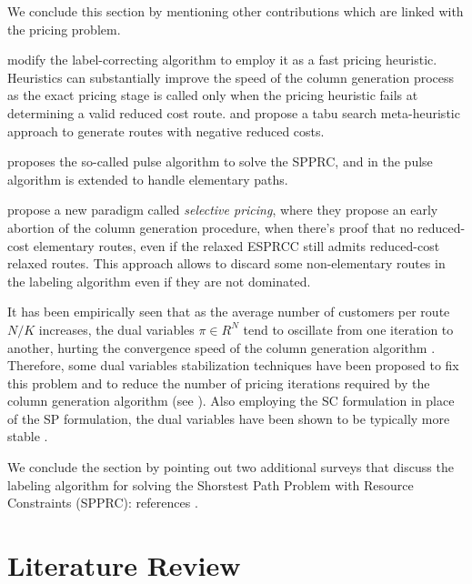 \medskip

We conclude this section by mentioning other contributions
which are linked with the pricing problem.

\textcite{fukasawa2006} modify the label-correcting
algorithm to employ it as a fast pricing heuristic.
Heuristics can substantially improve the speed of the column generation process
as the exact pricing stage is called only when the pricing heuristic
fails at determining a valid reduced cost route.
\textcite{desaulniers2008} and \textcite{archetti2011} propose a tabu search
meta-heuristic approach to generate routes with negative reduced costs.

\textcite{lozano2013} proposes the so-called pulse algorithm
to solve the SPPRC, and in \textcite{lozano2016} the pulse algorithm
is extended to handle elementary paths.

\textcite{desaulniers2019} propose a new paradigm called \textit{selective pricing},
where they propose an early abortion of the column generation procedure,
when there's proof that no reduced-cost elementary routes,
even if the relaxed ESPRCC still admits reduced-cost relaxed routes.
This approach allows to discard some non-elementary routes
in the labeling algorithm even if they are not dominated.

It has been empirically seen that
as the average number of customers per route $N / K$ increases,
the dual variables $\pi \in R^N$ tend to oscillate from one iteration to another,
hurting the convergence speed of the column generation algorithm \parencite{toth2014}.
Therefore, some dual variables stabilization techniques
have been proposed to fix this problem and
to reduce the number of pricing iterations required
by the column generation algorithm (see \cite{dumerle1999, rousseau2007, pessoa2013, pessoa2018automation}).
Also employing the SC formulation in place of the SP formulation,
the dual variables have been shown to be typically more stable \parencite{rousseau2007, feillet2010}.

We conclude the section by pointing out two additional surveys
that discuss the labeling algorithm for solving the Shorstest Path
Problem with Resource Constraints (SPPRC): references \textcite{irnich2005, pugliese2013}.



\section{Literature Review}
\label{sec:intro-literature-review}

